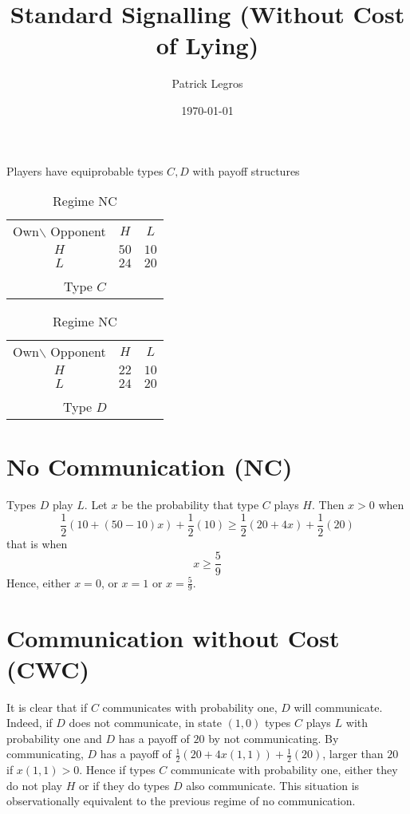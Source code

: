 \documentclass[12pt]{article}
\begin{document}
 
\title{Standard Signalling (Without Cost of Lying)} 
\author{Patrick Legros}
\date{\today} 
\maketitle


Players have equiprobable types $C,D$ with payoff structures
\begin{table}
	[!htbp] \centering 
	\begin{tabular}
		{c c c} {\small{Own$\backslash$} Opponent} & $H$ & $L$ \\
		\cline{2-3} $H$ & $50$& $10$\\
		\cline{2-3} $L$ & $24$& $20$ \\
		\cline{2-3}\\
		\multicolumn{3}{c}{Type $C$} 
	\end{tabular}
	\hspace{5em} 
	\begin{tabular}
		{c c c} {\small{Own$\backslash$} Opponent} & $H$ & $L$ \\
		\cline{2-3} $H$ & $22$& $10$\\
		\cline{2-3} $L$ & $24$& $20$ \\
		\cline{2-3}\\
		\multicolumn{3}{c}{Type $D$} 
	\end{tabular}
	\caption{Regime NC} 
\label{tbl:NC} 
\end{table}

\section{No Communication (NC)}
Types $D$ play $L$. Let $x$ be the probability that type $C$ plays $H$. Then $x>0$ when
\[
	\frac{1}{2}(10+(50-10)x)+\frac{1}{2}(10)\geq \frac{1}{2}(20+4 x)+\frac{1}{2}(20)
\]
that is when\[
x\geq \frac{5}{9}
	\]
Hence, either $x=0$, or $x=1$ or $x=\frac{5}{9}$.

\section{Communication without Cost (CWC)}
It is clear that if $C$ communicates with probability one, $D$ will communicate. Indeed, if $D$ does not communicate, in state $(1,0)$ types $C$ plays $L$ with  probability one and $D$ has a payoff of $20$ by not communicating. By communicating, $D$ has a payoff of $\frac{1}{2}(20+4x(1,1))+\frac{1}{2}(20)$, larger than $20$ if $x(1,1)>0$. Hence if types $C$ communicate with probability one, either they do not play $H$ or if they do types $D$ also communicate. This situation is observationally equivalent to the previous regime of no communication.
\end{document}
